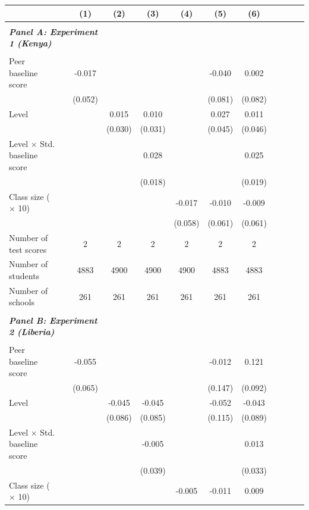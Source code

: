 \begin{center} 
\caption{\small Effect on test scores} 
\label{tab:descriptives} 
\begin{scriptsize}
\begin{threeparttable}
\begin{tabular} {@{} l l c c c c c c c c c c  @{}} \toprule \toprule
& &(1)&(2)&(3)&(4)&(5)&(6) \\ \midrule 
\\
\multicolumn{3}{l}{\textbf{\textit{Panel A: Experiment 1 (Kenya)}}} \\
\\
Peer baseline score &  & -0.017 &  &  &  & -0.040 & 0.002 \\
                 &  & (0.052) &  &  &  & (0.081) & (0.082) \\
Level &  &  & 0.015 & 0.010 &  & 0.027 & 0.011 \\
                 &  &  & (0.030) & (0.031) &  & (0.045) & (0.046) \\
Level $\times$ Std. baseline score &  &  &  & 0.028 &  &  & 0.025 \\
                 &  &  &  & (0.018) &  &  & (0.019) \\
Class size ($\times$ 10) &  &  &  &  & -0.017 & -0.010 & -0.009 \\
                 &  &  &  &  & (0.058) & (0.061) & (0.061) \\
\midrule
Number of test scores &  & 2 & 2 & 2 & 2 & 2 & 2 \\
Number of students &  & 4883 & 4900 & 4900 & 4900 & 4883 & 4883 \\
Number of schools &  & 261 & 261 & 261 & 261 & 261 & 261 \\
 \midrule
\\
\multicolumn{3}{l}{\textbf{\textit{Panel B: Experiment 2 (Liberia)}}} \\
\\
Peer baseline score &  & -0.055 &  &  &  & -0.012 & 0.121 \\
                 &  & (0.065) &  &  &  & (0.147) & (0.092) \\
Level &  &  & -0.045 & -0.045 &  & -0.052 & -0.043 \\
                 &  &  & (0.086) & (0.085) &  & (0.115) & (0.089) \\
Level $\times$ Std. baseline score &  &  &  & -0.005 &  &  & 0.013 \\
                 &  &  &  & (0.039) &  &  & (0.033) \\
Class size ($\times$ 10) &  &  &  &  & -0.005 & -0.011 & 0.009 \\

\end{tabular}
\end{threeparttable}
\end{scriptsize}
\end{center}
